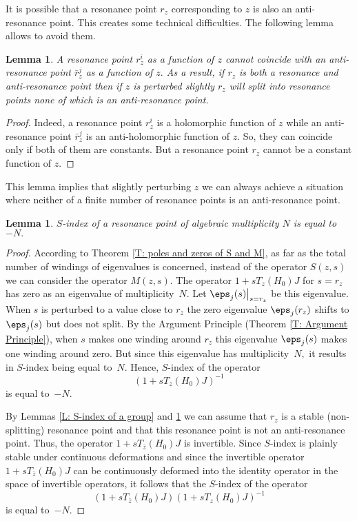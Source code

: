 \documentclass[11pt]{amsart}
\newtheorem{lemma}[thm]{Lemma}
\numberwithin{equation}{section}
\begin{document}
It is possible that a resonance point $r_z$ corresponding to $z$ is also an anti-resonance point.
This creates some technical difficulties.
The following lemma allows to avoid them.
\begin{lemma} \label{L: no res and anti-res}
A resonance point $r^i_z$ as a function of $z$ cannot coincide with an anti-resonance point $\bar r^j_z$ as a function of $z.$
As a result, if $r_z$ is both a resonance and anti-resonance point then if $z$ is perturbed slightly $r_z$ will split into resonance points none of which is an anti-resonance point.
\end{lemma}
\begin{proof} Indeed, a resonance point $r^i_z$ is a holomorphic function of $z$ while an anti-resonance point $\bar r^j_z$ is an anti-holomorphic function of $z.$
So, they can coincide only if both of them are constants. But a resonance point $r_z$ cannot be a constant function of $z.$
\end{proof}
This lemma implies that slightly perturbing $z$ we can always achieve a situation where neither of a finite number of resonance points is an anti-resonance point.

\begin{lemma} \label{L: S-index = alg mult} $S$-index of a resonance point of algebraic multiplicity $N$ is equal to~$-N.$
\end{lemma}
\begin{proof} According to Theorem \ref{T: poles and zeros of S and M}, as far as the total number of windings
of eigenvalues is concerned, instead of the operator $S(z,s)$ we can consider the operator $M(z,s).$
The operator $1+sT_z(H_0)J$ for $s=r_z$ has zero as an eigenvalue of multiplicity~$N.$
Let $\eps_j(s)\big|_{s=r_z}$ be this eigenvalue. When $s$ is perturbed to a value close to $r_z$ the zero eigenvalue $\eps_j(r_z)$ shifts
to $\eps_j(s)$ but does not split.
By the Argument Principle (Theorem \ref{T: Argument Principle}),
when $s$ makes one winding around $r_z$ this eigenvalue $\eps_j(s)$ makes one winding around zero.
But since this eigenvalue has multiplicity~$N,$ it results in $S$-index being equal to~$N.$
Hence, $S$-index of the operator
$$
  (1+sT_z(H_0)J)^{-1}
$$
is equal to~$-N.$

By Lemmas \ref{L: S-index of a group} and \ref{L: no res and anti-res} we can assume that $r_z$ is a stable (non-splitting) resonance point
and that this resonance point is not an anti-resonance point.
Thus, the operator $1+sT_{\bar z}(H_0)J$ is invertible.
Since $S$-index is plainly stable under continuous deformations and since
the invertible operator $1+sT_{\bar z}(H_0)J$ can be continuously deformed into the identity operator in the space of invertible operators,
it follows that the $S$-index of the operator
$$
  (1+sT_{\bar z}(H_0)J)(1+sT_z(H_0)J)^{-1}
$$
is equal to~$-N.$
\end{proof}
\end{document}
